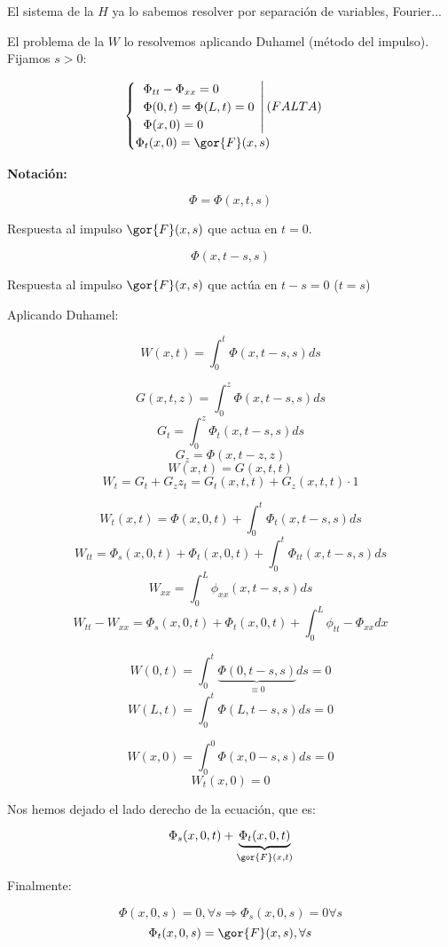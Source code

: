 			El sistema de la $H$ ya lo sabemos resolver por separación de variables, Fourier...

			El problema de la $W$ lo resolvemos aplicando Duhamel (método del impulso). Fijamos $s>0$:

			\[\begin{cases}
				\left.
				\begin{array}{l}
					\Phi_{tt} - \Phi_{xx} = 0 \\
					\Phi(0,t) = \Phi(L,t) = 0 \\
					\Phi(x,0) = 0 \\
				\end{array}
				\right| (FALTA) \\
				\Phi_t(x,0) = \gor{F}(x,s)
			\end{cases}\]


			\textbf{Notación:}


			\[ \Phi = \Phi(x,t,s)\]

			Respuesta al impulso $\gor{F}(x,s)$ que actua en $t=0$.

			\[ \Phi(x,t-s,s)\]

			Respuesta al impulso $\gor{F} (x,s)$ que actúa en $t-s = 0$ ($t=s$)

			Aplicando Duhamel:

			\[ W(x,t) = \int_0^t \Phi(x,t-s,s) ds \]

			\[ G(x,t,z) = \int_0^z \Phi(x,t-s,s) ds\]
			\[ G_t = \int_0^z \Phi_t (x,t-s,s) ds \]
			\[ G_z = \Phi(x,t-z,z) \]
			\[ W(x,t) = G(x,t,t)\]
			\[ W_t = G_t + G_z z_t = G_t(x,t,t) + G_z (x,t,t) \cdot 1\]

			\[ W_t(x,t) = \Phi(x,0,t)+ \int_0^t \Phi_t (x,t-s,s) ds\]
			\[ W_{tt} = \Phi_{s} (x,0,t) + \Phi_t(x,0,t) + \int_0^t \Phi_{tt} (x,t-s,s) ds  \]
			\[ W_{xx} = \int_0^L \phi_{xx} (x,t-s,s) ds \]
			\[ W_{tt} - W_{xx} = \Phi_{s}(x,0,t) + \Phi_t(x,0,t) + \int_0^L \phi_{tt} - \Phi_{xx} dx \]

			\[ W(0,t) = \int_0^t \underbrace{\Phi(0,t-s,s)}_{\equiv 0} ds = 0  \]
			\[ W(L,t) = \int_0^t \Phi(L,t-s,s) ds = 0 \]

			\[ W(x,0) = \int_0^0 \Phi(x,0-s,s) ds = 0 \]
			\[ W_t (x,0) = 0\]

			Nos hemos dejado el lado derecho de la ecuación, que es:

			\[\Phi_s (x,0,t) + \underbrace{\Phi_t(x,0,t)}_{\gor{F}(x,t)} \]

			Finalmente:

			\[ \Phi(x,0,s) = 0, \forall s \Rightarrow \Phi_s (x,0,s) = 0 \forall s  \]
			\[ \Phi_t(x,0,s) = \gor{F}(x,s), \forall s \]

